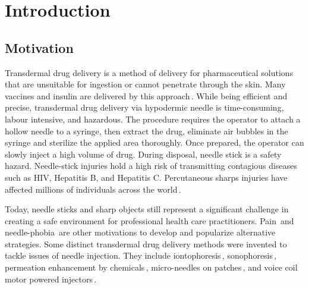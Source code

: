 \chapter{Introduction}      \label{Chapter:intro}


\section{Motivation}        \label{Chapter:intro/motivation}

        
    Transdermal drug delivery is a method of delivery for pharmaceutical solutions that are unsuitable for ingestion or cannot penetrate through the skin. Many vaccines and insulin are delivered by this approach\,\cite{sadrzadeh2007}. While being efficient and precise, transdermal drug delivery via hypodermic needle is time-consuming, labour intensive, and hazardous. The procedure requires the operator to attach a hollow needle to a syringe, then extract the drug, eliminate air bubbles in the syringe and sterilize the applied area thoroughly. Once prepared, the operator can slowly inject a high volume of drug. During disposal, needle stick is a safety hazard. Needle-stick injuries hold a high risk of transmitting contagious diseases such as HIV, Hepatitis B, and Hepatitis C. Percutaneous sharps injuries have affected millions of individuals across the world\,\cite{pruss2005}. 
    
    Today, needle sticks and sharp objects still represent a significant challenge in creating a safe environment for professional health care practitioners. Pain\,\cite{schneider1994} and needle-phobia\,\cite{hamilton2005,Nir2003} are other motivations to develop and popularize alternative strategies. Some distinct transdermal drug delivery methods were invented to tackle issues of needle injection. They include iontophoresis\,\cite{dhote2012}, sonophoresis\,\cite{bommanan1992}, permeation enhancement by chemicals\,\cite{karande2006}, micro-needles on patches\,\cite{cormier2004}, and voice coil motor powered injectors\,\cite{taberner2006}. 
    
